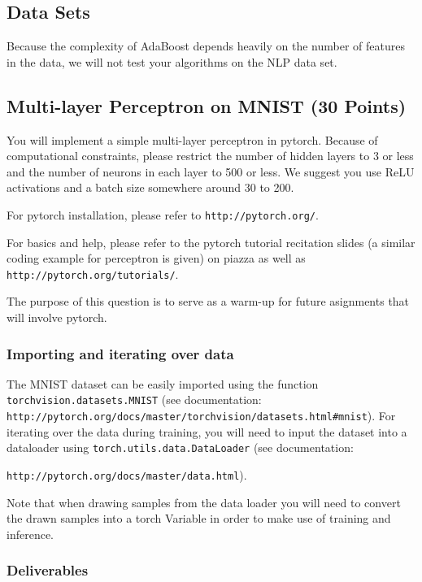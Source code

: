 \documentclass[11pt]{article}
\begin{document}
	\subsection{Data Sets}
	Because the complexity of AdaBoost depends heavily on the number of features in the data, we will not test your algorithms on the NLP data set.
	
	\subsection{Multi-layer Perceptron on MNIST (30 Points)}
	
	You will implement a simple multi-layer perceptron in pytorch. Because of computational constraints, please restrict the number of hidden layers to 3 or less and the number of neurons in each layer to 500 or less. We suggest you use ReLU activations and a batch size somewhere around 30 to 200. 
	
	For pytorch installation, please refer to \texttt{http://pytorch.org/}.
	
	For basics and help, please refer to the pytorch tutorial recitation slides (a similar coding example for perceptron is given) on piazza as well as \texttt{http://pytorch.org/tutorials/}.
	
	The purpose of this question is to serve as a warm-up for future asignments that will involve pytorch.
	
	\subsubsection{Importing and iterating over data}
	
	The MNIST dataset can be easily imported using the function \texttt{torchvision.datasets.MNIST} (see documentation: \texttt{http://pytorch.org/docs/master/torchvision/datasets.html\#mnist}). 
	For iterating over the data during training, you will need to input the dataset into a dataloader using \texttt{torch.utils.data.DataLoader} (see documentation: 
	
	\texttt{http://pytorch.org/docs/master/data.html}).
	
	Note that when drawing samples from the data loader you will need to convert the drawn samples into a torch Variable in order to make use of training and inference.
	
	\subsubsection{Deliverables}
	
\end{document}
